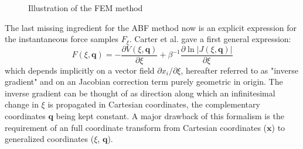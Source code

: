 \begin{figure}[H]
    \centering
    \vspace{-1cm}
    \caption{Illustration of the FEM method}
\label{fig:FEM}%
\end{figure}

The last missing ingredient for the ABF method now is an explicit expression for the instantaneous force samples $F_{\xi}$. Carter et al.\autocite{carter1989constrained} gave a first general expression:
\begin{equation}
  F(\xi,\textbf{q}) = -\frac{\partial V(\xi,\textbf{q})}{\partial \xi} + \beta^{-1} \frac{\partial \ln|J(\xi,\textbf{q})|}{\partial\xi} \label{eq:instforce old}
\end{equation}
which depends implicitly on a vector field $\partial x_i / \partial \xi$, hereafter referred to as "inverse gradient" and on an Jacobian correction term purely geometric in origin. The inverse gradient can be thought of as direction along which an infinitesimal change in $\xi$ is propagated in Cartesian coordinates, the complementary coordinates $\textbf{q}$ being kept constant. A major drawback of this formalism is the requirement of an full coordinate transform from Cartesian coordinates ($\textbf{x}$) to generalized coordinates ($\xi$, $\textbf{q}$).


